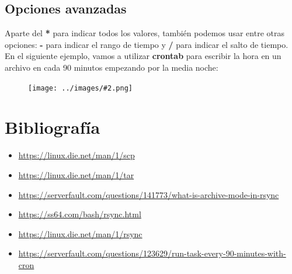 \documentclass[twoside]{article}
\newcommand{\image}[2]{
\begin{figure}[H]
    \texttt{[image: ../images/\#2.png]}
    \centering
\end{figure}
}
\begin{document}
\subsection{Opciones avanzadas}
Aparte del \textbf{*} para indicar todos los valores, también podemos usar entre otras opciones: \textbf{-} para indicar el rango de tiempo y \textbf{/} para indicar el salto de tiempo. En el siguiente ejemplo, vamos a utilizar \textbf{crontab} para escribir la hora en un archivo en cada 90 minutos empezando por la media noche:
\image{12}{21}

\newpage
\section{Bibliografía}
\begin{itemize}
    \item \url{https://linux.die.net/man/1/scp}
    \item \url{https://linux.die.net/man/1/tar}
    \item \url{https://serverfault.com/questions/141773/what-is-archive-mode-in-rsync}
    \item \url{https://ss64.com/bash/rsync.html}
    \item \url{https://linux.die.net/man/1/rsync}
    \item \url{https://serverfault.com/questions/123629/run-task-every-90-minutes-with-cron}
\end{itemize}
\end{document}
